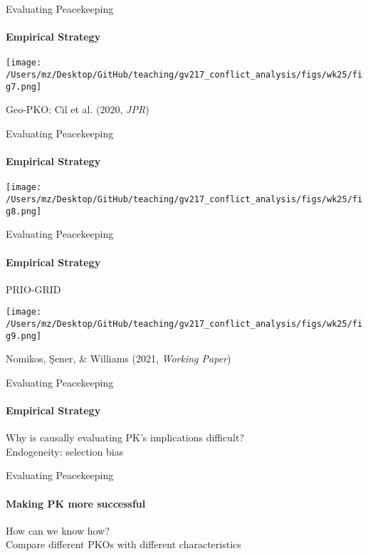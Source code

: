 \documentclass[handout]{beamer}
\begin{document}
\begin{frame}{Evaluating Peacekeeping}
\framesubtitle{Empirical Strategy}
\pause
\begin{center}
    \texttt{[image: /Users/mz/Desktop/GitHub/teaching/gv217\_conflict\_analysis/figs/wk25/fig7.png]}
\end{center}
\tiny Geo-PKO: Cil et al. (2020, \textit{JPR})
\end{frame}

\begin{frame}{Evaluating Peacekeeping}
\framesubtitle{Empirical Strategy}
\pause
\begin{center}
    \texttt{[image: /Users/mz/Desktop/GitHub/teaching/gv217\_conflict\_analysis/figs/wk25/fig8.png]}
\end{center}
\end{frame}

\begin{frame}{Evaluating Peacekeeping}
\framesubtitle{Empirical Strategy}
\pause PRIO-GRID
\pause
\begin{center}
    \texttt{[image: /Users/mz/Desktop/GitHub/teaching/gv217\_conflict\_analysis/figs/wk25/fig9.png]}
\end{center}
\tiny Nomikos, Şener, \& Williams (2021, \textit{Working Paper})
\end{frame}    

\begin{frame}{Evaluating Peacekeeping}
\framesubtitle{Empirical Strategy}
    \pause Why is causally evaluating PK's implications difficult?\\
    \pause Endogeneity: selection bias
\end{frame}

\begin{frame}{Evaluating Peacekeeping}
\framesubtitle{Making PK more successful}
    \pause How can we know how?\\
    \pause Compare different PKOs with different characteristics
\end{frame}
\end{document}
